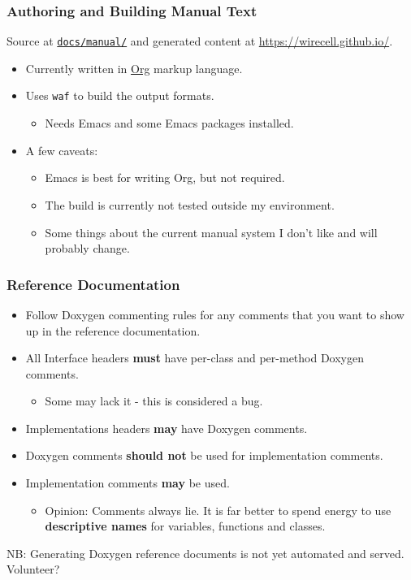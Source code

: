 \documentclass[xcolor=dvipsnames]{beamer}
\begin{document}
\begin{frame}
  \frametitle{Authoring and Building Manual Text}
  Source at \href{https://github.com/WireCell/wire-cell-docs/tree/master/manuals}{\texttt{docs/manual/}} and generated content at \url{https://wirecell.github.io/}.
  \begin{itemize}
  \item Currently written in \href{http://orgmode.org/}{Org} markup language.
  \item Uses \texttt{waf} to build the output formats.
    \begin{itemize}
    \item Needs Emacs and some Emacs packages installed.
    \end{itemize}
  \item A few caveats:
    \begin{itemize}\footnotesize
    \item Emacs is best for writing Org, but not required.
    \item The build is currently not tested outside my environment.
    \item Some things about the current manual system I don't like and
      will probably change.
    \end{itemize}
  \end{itemize}
\end{frame}

\begin{frame}
  \frametitle{Reference Documentation}
  \begin{itemize}
  \item Follow Doxygen commenting rules for any comments that you want
    to show up in the reference documentation.
  \item All Interface headers \textbf{must} have per-class and
    per-method Doxygen comments.
    \begin{itemize}
    \item Some may lack it - this is considered a bug.
    \end{itemize}
  \item Implementations headers \textbf{may} have Doxygen comments.
  \item Doxygen comments \textbf{should not} be used for
    implementation comments.
  \item Implementation comments \textbf{may} be used.
    \begin{itemize}\footnotesize
    \item Opinion: Comments always lie.  It is far better to spend
      energy to use \textbf{descriptive names} for variables,
      functions and classes.
    \end{itemize}
  \end{itemize}
  \footnotesize
  NB: Generating Doxygen reference documents is not yet automated and
  served. Volunteer?
\end{frame}
\end{document}
